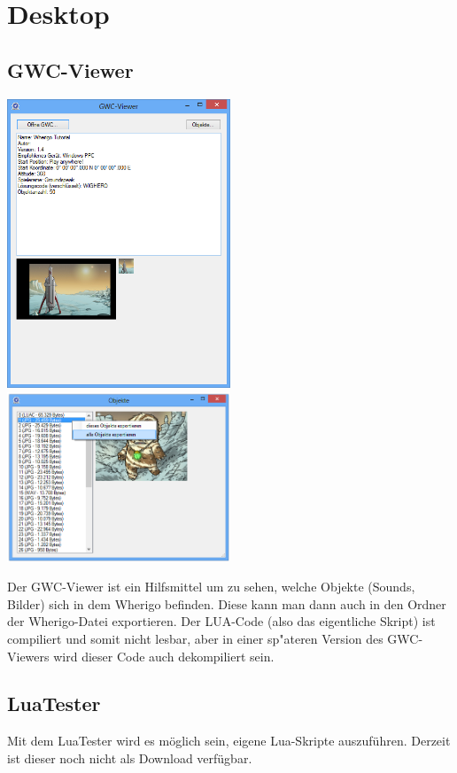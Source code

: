 \section{Desktop}

\subsection{GWC-Viewer}
\includegraphics[width=0.5\textwidth]{screens/viewer_main}
\includegraphics[width=0.5\textwidth]{screens/viewer_objects}

Der GWC-Viewer ist ein Hilfsmittel um zu sehen, welche Objekte (Sounds, Bilder) sich in dem Wherigo befinden. Diese kann man dann auch in den Ordner der Wherigo-Datei exportieren. Der LUA-Code (also das eigentliche Skript) ist compiliert und somit nicht lesbar, aber in einer sp"ateren Version des GWC-Viewers wird dieser Code auch dekompiliert sein.

\subsection{LuaTester}
Mit dem LuaTester wird es möglich sein, eigene Lua-Skripte auszuführen. Derzeit ist dieser noch nicht als Download verfügbar.
